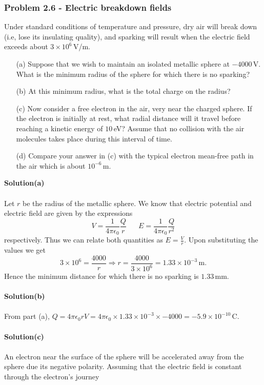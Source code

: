 \documentclass{article}
\begin{document}
\subsubsection*{Problem 2.6 - Electric breakdown fields}
Under standard conditions of temperature and pressure, dry air will break down (i.e, lose its insulating quality), and sparking will result when the electric field exceeds about $3\times10^6$\,V/m.
\begin{enumerate}
\item[(a)]Suppose that we wish to maintain an isolated metallic sphere at $-4000$\,V. What is the minimum radius of the sphere for which there is no sparking?
\item[(b)]At this minimum radius, what is the total charge on the radius?
\item[(c)]Now consider a free electron in the air, very near the charged sphere. If the electron is initially at rest, what radial distance will it travel before reaching a kinetic energy of $10$\,eV? Assume that no collision with the air molecules takes place during this interval of time.
\item[(d)]Compare your answer in (c) with the typical electron mean-free path in the air which is about $10^{-6}$\,m. 
\end{enumerate}
\textbf{Solution(a)}
\\
\\Let $r$ be the radius of the metallic sphere. We know that electric potential and electric field are given by the expressions
\[V=\frac{1}{4\pi\epsilon_0}\frac{Q}{r}\,\,\,\,\,\,\,\,\,\,E=\frac{1}{4\pi\epsilon_0}\frac{Q}{r^2}\]
respectively. Thus we can relate both quantities as $E=\frac{V}{r}$. Upon substituting the values we get
\[3\times10^6=\frac{4000}{r}\Rightarrow r=\frac{4000}{3\times10^6}=1.33\times10^{-3}\,\text{m}.\]
Hence the minimum distance for which there is no sparking is $1.33$\,mm.
\\
\\\textbf{Solution(b)}
\\
\\From part (a), $Q=4\pi\epsilon_0rV=4\pi\epsilon_0\times1.33\times10^{-3}\times-4000=-5.9\times10^{-10}\,$C.
\\
\\\textbf{Solution(c)}
\\
\\An electron near the surface of the sphere will be accelerated away from the sphere due its negative polarity. Assuming that the electric field is constant through the electron's journey
\end{document}
